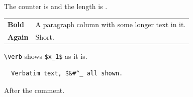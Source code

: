 \documentclass{article}
\newcounter{k}
\newlength{\w}
\begin{document}
\setlength{\w}{2cm + 3pt * 2}
\setcounter{k}{3 * 4 - 2}
The counter is \thek{} and the length is \the\w.
\begin{tabular}{>{\bfseries}l|p{3cm}}
Bold & A paragraph column with some longer text in it. \\
Again & Short.
\end{tabular}

\verb|\verb| shows \verb+$x_1$+ as it is.
\begin{verbatim}
  Verbatim text, $&#^_ all shown.
\end{verbatim}

After the comment.
\end{document}
